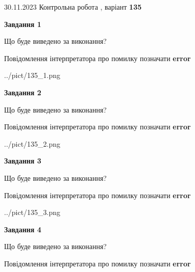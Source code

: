 \documentclass[12pt, ukrainian]{article}
\begin{document}
{{30.11.2023 Контрольна робота , варіант  \No \textbf { 135 }\par}}
{




{\begin {center}\textbf{Завдання 1}\end {center}}\par
Що буде виведено за виконання? \par
Повідомлення інтерпретатора про помилку позначати \textbf{error}

\begin{center}
	{../pict/135_1.png}
\end{center}
\newpage

{\begin {center}\textbf{Завдання 2}\end {center}}\par
Що буде виведено за виконання? \par
Повідомлення інтерпретатора про помилку позначати \textbf{error}

\begin{center}
	{../pict/135_2.png}
\end{center}
\newpage

{\begin {center}\textbf{Завдання 3}\end {center}}\par
Що буде виведено за виконання? \par
Повідомлення інтерпретатора про помилку позначати \textbf{error}

\begin{center}
	{../pict/135_3.png}
\end{center}
\newpage

{\begin {center}\textbf{Завдання 4}\end {center}}\par
Що буде виведено за виконання? \par
Повідомлення інтерпретатора про помилку позначати \textbf{error}

}
\end{document}

